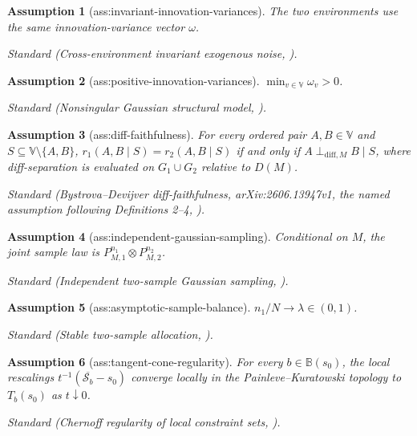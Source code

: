 \documentclass{article}
\newtheorem{assumption}{Assumption}
\begin{document}
\begin{assumption}[ass:invariant-innovation-variances]\label{ass:invariant-innovation-variances}
The two environments use the same innovation-variance vector \(\omega\).
\par\smallskip\noindent\emph{Standard} (Cross-environment invariant exogenous noise, \cite{BystrovaDevijver2026LDiffPC}).
\end{assumption}

\begin{assumption}[ass:positive-innovation-variances]\label{ass:positive-innovation-variances}
\(\min_{v\in\mathbb V}\omega_v>0\).
\par\smallskip\noindent\emph{Standard} (Nonsingular Gaussian structural model, \cite{WangSquiresBelyaevaUhler2018DCI}).
\end{assumption}

\begin{assumption}[ass:diff-faithfulness]\label{ass:diff-faithfulness}
For every ordered pair \(A,B\in\mathbb V\) and \(S\subseteq\mathbb V\setminus\{A,B\}\), \(r_1(A,B\mid S)=r_2(A,B\mid S)\) if and only if \(A\perp_{\mathrm{diff},M}B\mid S\), where diff-separation is evaluated on \(G_1\cup G_2\) relative to \(D(M)\).
\par\smallskip\noindent\emph{Standard} (Bystrova--Devijver diff-faithfulness, arXiv:2606.13947v1, the named assumption following Definitions 2--4, \cite{BystrovaDevijver2026LDiffPC}).
\end{assumption}

\begin{assumption}[ass:independent-gaussian-sampling]\label{ass:independent-gaussian-sampling}
Conditional on \(M\), the joint sample law is \(P_{M,1}^{n_1}\otimes P_{M,2}^{n_2}\).
\par\smallskip\noindent\emph{Standard} (Independent two-sample Gaussian sampling, \cite{Anderson2003Multivariate}).
\end{assumption}

\begin{assumption}[ass:asymptotic-sample-balance]\label{ass:asymptotic-sample-balance}
\(n_1/N\to\lambda\in(0,1)\).
\par\smallskip\noindent\emph{Standard} (Stable two-sample allocation, \cite{VanDerVaart1998Asymptotic}).
\end{assumption}

\begin{assumption}[ass:tangent-cone-regularity]\label{ass:tangent-cone-regularity}
For every \(b\in\mathbb B(s_0)\), the local rescalings \(t^{-1}(\overline{\mathcal S_b}-s_0)\) converge locally in the Painleve--Kuratowski topology to \(T_b(s_0)\) as \(t\downarrow0\).
\par\smallskip\noindent\emph{Standard} (Chernoff regularity of local constraint sets, \cite{Geyer1994Constrained}).
\end{assumption}
\end{document}
